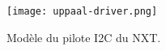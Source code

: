 \documentclass{beamer}
\begin{document}
%

%

%

      \begin{frame}
        \frametitle{\secname}
        \framesubtitle{\subsecname}

        \begin{figure}
          \centering
          \texttt{[image: uppaal-driver.png]}
          \caption{Modèle du pilote I2C du NXT.}
        \end{figure}
      \end{frame}

%

%
\end{document}
